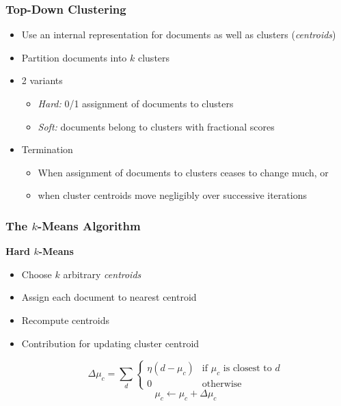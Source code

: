 \documentclass{beamer}
\begin{document}
\begin{frame}
  \frametitle{Top-Down Clustering}

  \begin{itemize}
  \item Use an internal representation for documents as well as clusters (\emph{centroids})
  \item Partition documents into $k$ clusters
  \item 2 variants
    \begin{itemize}
    \item \emph{Hard:} 0/1 assignment of documents to clusters
    \item \emph{Soft:} documents belong to clusters with fractional scores
    \end{itemize}
  \item Termination
    \begin{itemize}
    \item When assignment of documents to clusters ceases to change much, or
    \item when cluster centroids move negligibly over successive
      iterations
    \end{itemize}
  \end{itemize}

\end{frame}


\begin{frame}
  \frametitle{The $k$-Means Algorithm}

  \textbf{Hard $k$-Means}
  \begin{itemize}
  \item Choose $k$ arbitrary \emph{centroids}
  \item Assign each document to nearest centroid
  \item Recompute centroids
  \end{itemize}

  \begin{itemize}
  \item Contribution for updating cluster centroid
    \begin{block}{}
      \begin{displaymath}
        \Delta\mu_c = \sum_d\left\{
          \begin{array}{ll}
            \eta(d - \mu_c) & \text{if $\mu_c$ is closest to $d$} \\
            0 & \text{otherwise}
          \end{array}
        \right.
      \end{displaymath}
      \begin{displaymath}
        \mu_c \leftarrow \mu_c + \Delta\mu_c
      \end{displaymath}
    \end{block}
  \end{itemize}

\end{frame}
\end{document}

